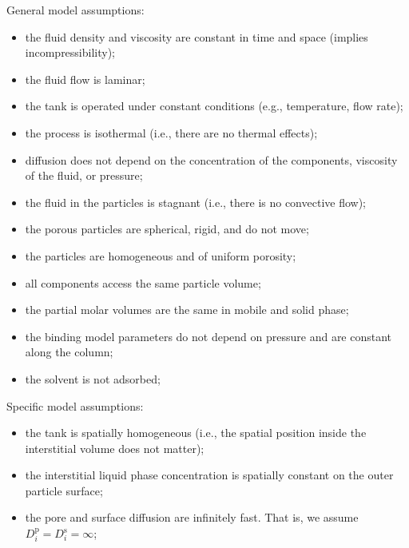 \documentclass{article}
\begin{document}
General model assumptions:
\begin{itemize}
    \item the fluid density and viscosity are constant in time and space (implies incompressibility);
    \item the fluid flow is laminar;
    \item the tank is operated under constant conditions (e.g., temperature, flow rate);
    \item the process is isothermal (i.e., there are no thermal effects);
    \item diffusion does not depend on the concentration of the components, viscosity of the fluid, or pressure;
    \item the fluid in the particles is stagnant (i.e., there is no convective flow);
    \item the porous particles are spherical, rigid, and do not move;
    \item the particles are homogeneous and of uniform porosity;
    \item all components access the same particle volume;
    \item the partial molar volumes are the same in mobile and solid phase;
    \item the binding model parameters do not depend on pressure and are constant along the column;
    \item the solvent is not adsorbed;
\end{itemize}

Specific model assumptions:
\begin{itemize}
    \item the tank is spatially homogeneous (i.e., the spatial position inside the interstitial volume does not matter);
    \item the interstitial liquid phase concentration is spatially constant on the outer particle surface;
    \item the pore and surface diffusion are infinitely fast. That is, we assume $D^{\mathrm{p}}_{i} = D^{\mathrm{s}}_{i} = \infty$;
\end{itemize}
\end{document}
